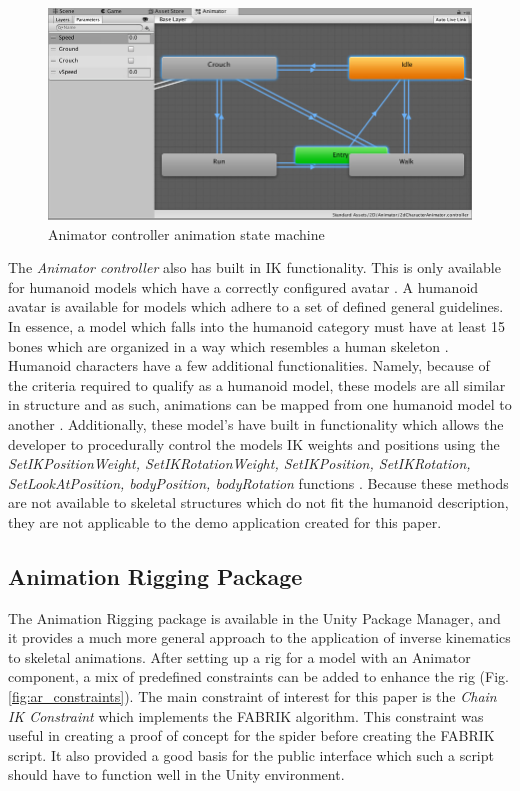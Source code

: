 \begin{figure}
    \centering
    \includegraphics[width=\textwidth]{grafika/animator_controller.png}
    \caption{Animator controller animation state machine \cite{unity_animator}}
    \label{fig:anim_state}
\end{figure}

The \textit{Animator controller} also has built in IK functionality. This is only
available for humanoid models which have a correctly configured avatar
\cite{unity_ik}. A humanoid avatar is available for models which adhere to a set
of defined general guidelines. In essence, a model which falls into the humanoid
category must have at least 15 bones which are organized in a way which
resembles a human skeleton \cite{unity_humanoid_import}. Humanoid characters
have a few additional functionalities. Namely, because of the criteria required
to qualify as a humanoid model, these models are all similar in structure and as
such, animations can be mapped from one humanoid model to another
\cite{unity_humanoid_avatars}. Additionally, these model's have built in
functionality which allows the developer to procedurally control the models IK
weights and positions using the \textit{SetIKPositionWeight,
SetIKRotationWeight, SetIKPosition, SetIKRotation, SetLookAtPosition,
bodyPosition, bodyRotation} functions \cite{unity_ik, unity_humanoid_avatars}.
Because these methods are not available to skeletal structures which do not fit
the humanoid description, they are not applicable to the demo application
created for this paper.

\subsection{Animation Rigging Package}

The Animation Rigging package is available in the Unity Package Manager, and it
provides a much more general approach to the application of inverse kinematics
to skeletal animations. After setting up a rig for a model with an Animator
component, a mix of predefined constraints can be added to enhance the rig
(Fig. \ref{fig:ar_constraints}). The main constraint of interest for this
paper is the \textit{Chain IK Constraint} which implements the FABRIK algorithm.
This constraint was useful in creating a proof of concept for the spider before
creating the FABRIK script. It also provided a good basis for the public
interface which such a script should have to function well in the Unity
environment.

